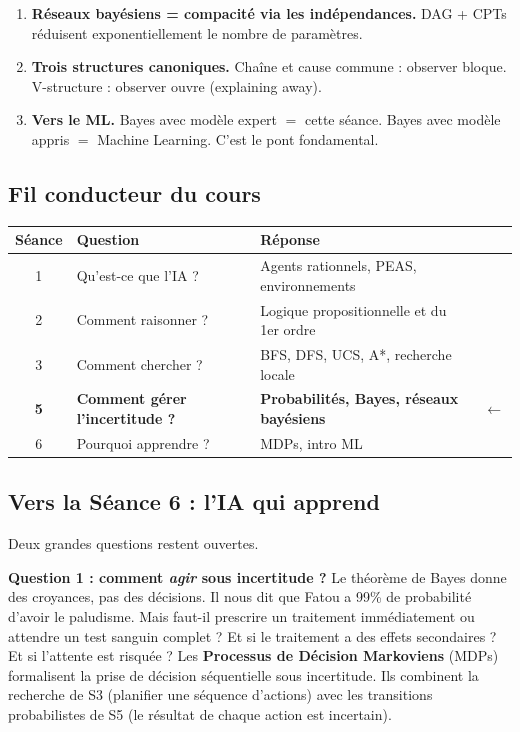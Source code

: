 \documentclass[11pt,a4paper]{article}
\newcommand{\cmark}{\ding{51}}
\begin{document}
\begin{retenirbox}
\begin{enumerate}
    \item \textbf{Réseaux bayésiens = compacité via les indépendances.} DAG + CPTs réduisent exponentiellement le nombre de paramètres.
    
    \item \textbf{Trois structures canoniques.} Chaîne et cause commune : observer bloque. V-structure : observer ouvre (explaining away).
    
    \item \textbf{Vers le ML.} Bayes avec modèle expert $=$ cette séance. Bayes avec modèle appris $=$ Machine Learning. C'est le pont fondamental.
\end{enumerate}
\end{retenirbox}

\subsection{Fil conducteur du cours}

\begin{center}
\begin{tabular}{|c|l|l|c|}
\hline
\textbf{Séance} & \textbf{Question} & \textbf{Réponse} & \\
\hline
1 & Qu'est-ce que l'IA ? & Agents rationnels, PEAS, environnements & \cmark \\
2 & Comment raisonner ? & Logique propositionnelle et du 1er ordre & \cmark \\
3 & Comment chercher ? & BFS, DFS, UCS, A*, recherche locale & \cmark \\
\textbf{5} & \textbf{Comment gérer l'incertitude ?} & \textbf{Probabilités, Bayes, réseaux bayésiens} & $\leftarrow$ \\
6 & Pourquoi apprendre ? & MDPs, intro ML & \\
\hline
\end{tabular}
\end{center}

\subsection{Vers la Séance 6 : l'IA qui apprend}

Deux grandes questions restent ouvertes.

\textbf{Question 1 : comment \textit{agir} sous incertitude ?} Le théorème de Bayes donne des croyances, pas des décisions. Il nous dit que Fatou a 99\% de probabilité d'avoir le paludisme. Mais faut-il prescrire un traitement immédiatement ou attendre un test sanguin complet ? Et si le traitement a des effets secondaires ? Et si l'attente est risquée ? Les \textbf{Processus de Décision Markoviens} (MDPs) formalisent la prise de décision séquentielle sous incertitude. Ils combinent la recherche de S3 (planifier une séquence d'actions) avec les transitions probabilistes de S5 (le résultat de chaque action est incertain).
\end{document}
